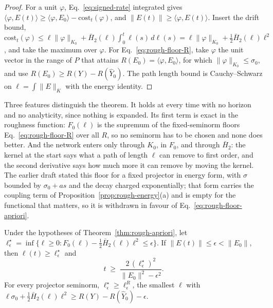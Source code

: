 \begin{proof}
For a unit $\varphi$, Eq.~\eqref{eq:signed-rate} integrated gives
$\langle\varphi,E(t)\rangle\ge\langle\varphi,E_0\rangle-\mathrm{cost}_t(\varphi)$,
and $\|E(t)\|\ge\langle\varphi,E(t)\rangle$. Insert the drift bound,
$\mathrm{cost}_t(\varphi)\le\ell\|\varphi\|_{K_0}+\bar H_2(\ell)\int_0^t\ell(s)\,d\ell(s)
=\ell\|\varphi\|_{K_0}+\tfrac12\bar H_2(\ell)\ell^2$, and take the maximum over
$\varphi$. For Eq.~\eqref{eq:rough-floor-R}, take $\varphi$ the unit vector in
the range of $P$ that attains $R(E_0)=\langle\varphi,E_0\rangle$, for which
$\|\varphi\|_{K_0}\le\sigma_0$, and use $R(E_0)\ge R(Y)-R(\hat Y_0)$. The path
length bound is Cauchy--Schwarz on $\ell=\int\|E\|_K$ with the energy
identity.
\end{proof}

Three features distinguish the theorem. It holds at every time with no
horizon and no analyticity, since nothing is expanded. Its first term is
exact in the roughness function: $F_0(\ell)$ is the supremum of the
fixed-seminorm floors Eq.~\eqref{eq:rough-floor-R} over all $R$, so no
seminorm has to be chosen and none does better. And the network enters only
through $K_0$, in $F_0$, and through $\bar H_2$: the kernel at the start says
what a path of length $\ell$ can remove to first order, and the second
derivative says how much more it can remove by moving the kernel. The
earlier draft stated this floor for a fixed projector in energy form, with
$\sigma$ bounded by $\sigma_0+as$ and the decay charged exponentially; that
form carries the coupling term of Proposition~\ref{prop:rough-energy}(a) and
is empty for the functional that matters, so it is withdrawn in favour of
Eq.~\eqref{eq:rough-floor-apriori}.

\begin{corollary}
\label{cor:min-time-rough}
Under the hypotheses of Theorem~\ref{thm:rough-apriori}, let
$\ell_\epsilon^\star=\inf\{\ell\ge0: F_0(\ell)-\tfrac12\bar H_2(\ell)\ell^2\le\epsilon\}$.
If $\|E(t)\|\le\epsilon<\|E_0\|$, then $\ell(t)\ge\ell_\epsilon^\star$ and
\begin{equation}
t \;\ge\; \frac{2\,(\ell_\epsilon^\star)^2}{\|E_0\|^2-\epsilon^2} .
\label{eq:min-time-rough}
\end{equation}
For every projector seminorm, $\ell_\epsilon^\star\ge\ell_\epsilon^R$, the
smallest $\ell$ with $\ell\sigma_0+\tfrac12\bar H_2(\ell)\ell^2\ge R(Y)-R(\hat Y_0)-\epsilon$.
\end{corollary}

